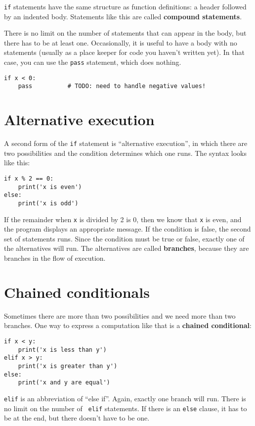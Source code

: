 {\tt if} statements have the same structure as function definitions:
a header followed by an indented body.  Statements like this are
called {\bf compound statements}.

There is no limit on the number of statements that can appear in
the body, but there has to be at least one.
Occasionally, it is useful to have a body with no statements (usually
as a place keeper for code you haven't written yet).  In that
case, you can use the {\tt pass} statement, which does nothing.

\begin{verbatim}
if x < 0:
    pass          # TODO: need to handle negative values!
\end{verbatim}
%

\section{Alternative execution}
\label{alternative.execution}

A second form of the {\tt if} statement is ``alternative execution'',
in which there are two possibilities and the condition determines
which one runs.  The syntax looks like this:

\begin{verbatim}
if x % 2 == 0:
    print('x is even')
else:
    print('x is odd')
\end{verbatim}
%
If the remainder when {\tt x} is divided by 2 is 0, then we know that
{\tt x} is even, and the program displays an appropriate message.  If
the condition is false, the second set of statements runs.
Since the condition must be true or false, exactly one of the
alternatives will run.  The alternatives are called {\bf
  branches}, because they are branches in the flow of execution.



\section{Chained conditionals}

Sometimes there are more than two possibilities and we need more than
two branches.  One way to express a computation like that is a {\bf
chained conditional}:

\begin{verbatim}
if x < y:
    print('x is less than y')
elif x > y:
    print('x is greater than y')
else:
    print('x and y are equal')
\end{verbatim}
%
{\tt elif} is an abbreviation of ``else if''.  Again, exactly one
branch will run.  There is no limit on the number of {\tt
elif} statements.  If there is an {\tt else} clause, it has to be
at the end, but there doesn't have to be one.

